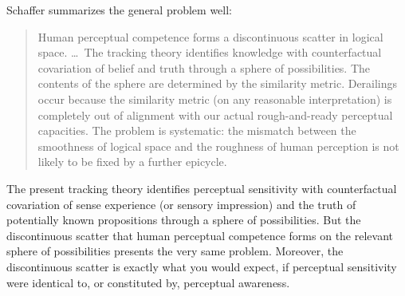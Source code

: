 \documentclass[12pt]{article}
\begin{document}
Schaffer summarizes the general problem well:
\begin{quote}
    Human perceptual competence forms a discontinuous scatter in logical space. \ldots\ The tracking theory identifies knowledge with counterfactual covariation of belief and truth through a sphere of possibilities. The contents of the sphere are determined by the similarity metric. Derailings occur because the similarity metric (on any reasonable interpretation) is completely out of alignment with our actual rough-and-ready perceptual capacities. The problem is systematic: the mismatch between the smoothness of logical space and the roughness of human perception is not likely to be fixed by a further epicycle. \citep[42]{Schaffer:2003vn}
\end{quote}
The present tracking theory identifies perceptual sensitivity with counterfactual covariation of sense experience (or sensory impression) and the truth of potentially known propositions through a sphere of possibilities. But the discontinuous scatter that human perceptual competence forms on the relevant sphere of possibilities presents the very same problem. Moreover, the discontinuous scatter is exactly what you would expect, if perceptual sensitivity were identical to, or constituted by, perceptual awareness. %
\end{document}

